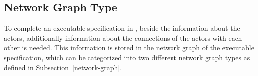 %



\subsection{Network Graph Type}

To complete an executable specification in \SysteMoC{}, beside
the information about the actors, additionally information about the connections
of the actors with each other is needed. This information is stored
in the network graph of the executable specification, which can
be categorized into two different network graph types as defined in
Subsection~\ref{network-graph}.


